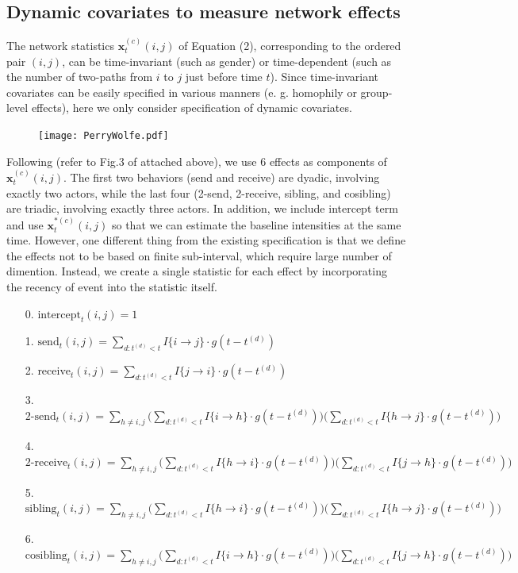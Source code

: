 \documentclass[a4paper]{article}
\begin{document}
\subsection{Dynamic covariates to measure network effects}
The network statistics $\boldsymbol{x}^{(c)}_t(i, j)$ of Equation (2), corresponding to the ordered pair $(i, j)$, can be time-invariant (such as gender) or time-dependent (such as the number of two-paths from $i$ to $j$ just before time $t$). Since time-invariant covariates can be easily specified in various manners (e. g. homophily or group-level effects), here we only consider specification of dynamic covariates.
\begin{figure}[ht]
	\centering
	\texttt{[image: PerryWolfe.pdf]} 
	\label{fig:PerryWolfeplot}
\end{figure}
\newline Following \cite{PerryWolfe2012} (refer to Fig.3 of \cite{PerryWolfe2012} attached above), we use 6 effects as components of $\boldsymbol{x}^{(c)}_t(i, j)$. The first two behaviors (send and receive) are dyadic, involving exactly two actors,
while the last four (2-send, 2-receive, sibling, and cosibling) are triadic, involving exactly three actors. In addition, we include intercept term and use $\boldsymbol{x}^{*(c)}_t(i, j)$ so that we can estimate the baseline intensities at the same time. However, one different thing from the existing specification is that we define the effects not to be based on finite sub-interval, which require large number of dimention. Instead, we create a single statistic for each effect by incorporating the recency of event into the statistic itself. 
\begin{itemize}[leftmargin=*,rightmargin=-1cm ]
\item [0.] $\mbox{intercept}_t(i, j) = 1$
\item [1.]  $\mbox{send}_t(i, j)=\sum\limits_{d: t^{(d)}<t} I\{i\rightarrow j\}\cdot g(t-t^{(d)})$
\item [2.] $\mbox{receive}_t(i, j)=\sum\limits_{d: t^{(d)}<t} I\{j\rightarrow i\}\cdot g(t-t^{(d)})$
\item [3.] $\mbox{2-send}_t(i, j)=\sum\limits_{h \neq i, j}\Big(\sum\limits_{d: t^{(d)}<t}  I\{i\rightarrow h\}\cdot g(t-t^{(d)})\Big)\Big(\sum\limits_{d: t^{(d)}<t} I\{h\rightarrow j\}\cdot g(t-t^{(d)})\Big)$
\item [4.]  $\mbox{2-receive}_t(i, j)=\sum\limits_{h \neq i, j}\Big(\sum\limits_{d: t^{(d)}<t} I\{h\rightarrow i\}\cdot g(t-t^{(d)})\Big)\Big(\sum\limits_{d: t^{(d)}<t} I\{j\rightarrow h\}\cdot g(t-t^{(d)})\Big)$
\item [5.] $\mbox{sibling}_t(i, j)=\sum\limits_{h \neq i, j}\Big(\sum\limits_{d: t^{(d)}<t} I\{h\rightarrow i\}\cdot g(t-t^{(d)})\Big)\Big(\sum\limits_{d: t^{(d)}<t} I\{h\rightarrow j\}\cdot g(t-t^{(d)})\Big)$
\item [6.] $\mbox{cosibling}_t(i, j)=\sum\limits_{h \neq i, j}\Big(\sum\limits_{d: t^{(d)}<t} I\{i\rightarrow h\}\cdot g(t-t^{(d)})\Big)\Big(\sum\limits_{d: t^{(d)}<t} I\{j\rightarrow h\}\cdot g(t-t^{(d)})\Big)$
\end{itemize}
\end{document}
